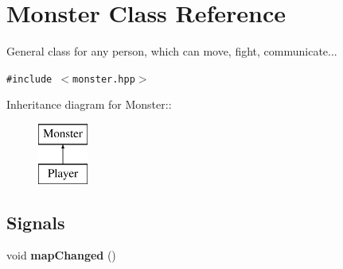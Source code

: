 \section{Monster Class Reference}
\label{classMonster}
General class for any person, which can move, fight, communicate...  


{\tt \#include $<$monster.hpp$>$}

Inheritance diagram for Monster::\begin{figure}[H]
\begin{center}
\leavevmode
\includegraphics[height=2cm]{classMonster}
\end{center}
\end{figure}
\subsection*{Signals}
\begin{CompactItemize}
\item 
void {\bf map\-Changed} ()
\end{CompactItemize}
